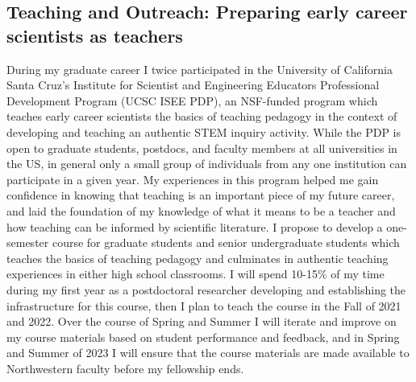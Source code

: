 \documentclass[aasms,12pt]{article}
\begin{document}
\subsection{Teaching and Outreach: Preparing early career scientists as teachers}
During my graduate career I twice participated in the University of California Santa Cruz's Institute for Scientist and Engineering Educators Professional Development Program (UCSC ISEE PDP), an NSF-funded program which teaches early career scientists the basics of teaching pedagogy in the context of developing and teaching an authentic STEM inquiry activity.
While the PDP is open to graduate students, postdocs, and faculty members at all universities in the US, in general only a small group of individuals from any one institution can participate in a given year.
My experiences in this program helped me gain confidence in knowing that teaching is an important piece of my future career, and laid the foundation of my knowledge of what it means to be a teacher and how teaching can be informed by scientific literature.
I propose to develop a one-semester course for graduate students and senior undergraduate students which teaches the basics of teaching pedagogy and culminates in authentic teaching experiences in either high school classrooms.
I will spend 10-15\% of my time during my first year as a postdoctoral researcher developing and establishing the infrastructure for this course, then I plan to teach the course in the Fall of 2021 and 2022.
Over the course of Spring and Summer I will iterate and improve on my course materials based on student performance and feedback, and in Spring and Summer of 2023 I will ensure that the course materials are made available to Northwestern faculty before my fellowship ends.
\end{document}
